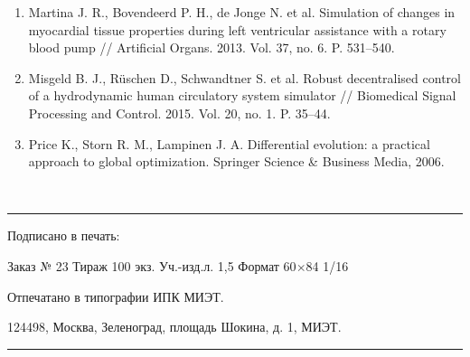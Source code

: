 \begin{enumerate}[leftmargin=25pt, itemsep=12pt]
 \item Martina J. R., Bovendeerd P. H., de Jonge N. et al. Simulation of changes in myocardial tissue properties during left ventricular assistance with a rotary blood pump // Artificial Organs. 2013. Vol. 37, no. 6. P. 531--540.
 \item Misgeld B. J., R\"uschen D., Schwandtner S. et al. Robust decentralised control of a hydrodynamic human circulatory system simulator // Biomedical Signal Processing and Control. 2015. Vol. 20, no. 1. P. 35--44.
  \item Price K., Storn R. M., Lampinen J. A. Differential evolution: a practical approach to global optimization. Springer Science \& Business Media, 2006.

\end{enumerate}

~
\vspace{500px}
~\newpage
\vspace{0px}~\vskip20.7cm \thispagestyle{empty}
\begin{center}
\rule{0.80\textwidth}{.5pt}

Подписано в печать:

Заказ № 23 Тираж 100 экз. Уч.-изд.л. 1,5 Формат 60$\times$84 1/16 %

Отпечатано в типографии ИПК МИЭТ.

124498, Москва, Зеленоград, площадь Шокина, д. 1, МИЭТ.

\rule{0.80\textwidth}{.5pt}
\end{center}
